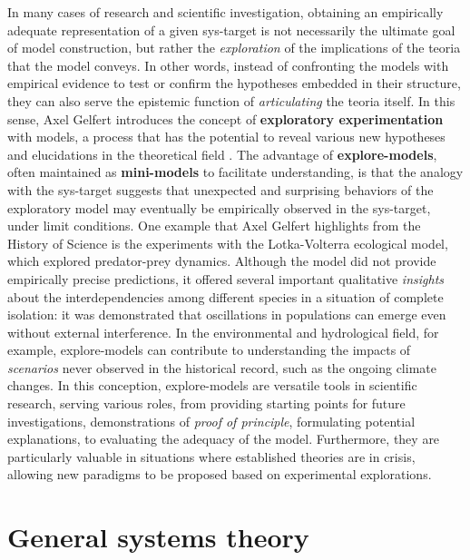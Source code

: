 \documentclass[./main_en.tex]{subfiles}
\begin{document}
\par In many cases of research and scientific investigation, obtaining an empirically adequate representation of a given \gls{sys-target} is not necessarily the ultimate goal of model construction, but rather the \textit{exploration} of the implications of the \gls{teoria} that the \gls{model} conveys. In other words, instead of confronting the models with empirical evidence to test or confirm the hypotheses embedded in their structure, they can also serve the epistemic function of \textit{articulating} the \gls{teoria} itself. In this sense, Axel Gelfert introduces the concept of \textbf{exploratory experimentation} with models, a process that has the potential to reveal various new hypotheses and elucidations in the theoretical field \cite{gelfert2016}. The advantage of \textbf{\gls{explore-models}}, often maintained as \textbf{\gls{mini-models}} to facilitate understanding, is that the \gls{analogy} with the \gls{sys-target} suggests that unexpected and surprising behaviors of the exploratory \gls{model} may eventually be empirically observed in the \gls{sys-target}, under limit conditions. One example that Axel Gelfert highlights from the History of Science is the experiments with the Lotka-Volterra ecological \gls{model}, which explored predator-prey dynamics. Although the \gls{model} did not provide empirically precise predictions, it offered several important qualitative \textit{insights} about the interdependencies among different species in a situation of complete isolation: it was demonstrated that oscillations in populations can emerge even without external interference. In the environmental and hydrological field, for example, \gls{explore-models} can contribute to understanding the impacts of \textit{scenarios} never observed in the historical record, such as the ongoing climate changes. In this conception, \gls{explore-models} are versatile tools in scientific research, serving various roles, from providing starting points for future investigations, demonstrations of \textit{proof of principle}, formulating potential explanations, to evaluating the adequacy of the \gls{model}. Furthermore, they are particularly valuable in situations where established theories are in crisis, allowing new paradigms to be proposed based on experimental explorations.

\section{General systems theory} \label{sec:sys:systems}
\end{document}
